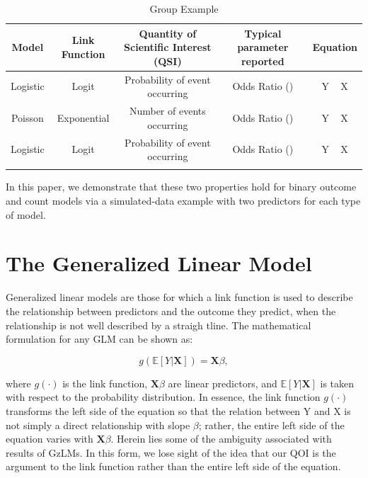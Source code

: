 \documentclass[jou, apacite]{apa6}
\begin{document}
\begin{table}[htp]
\centering
\addtolength{\tabcolsep}{3pt} %

\caption{Group Example}

\begin{tabular}{| c | c | c| c | c |}
\toprule
Model & Link Function & Quantity of Scientific Interest (QSI) & Typical parameter reported & Equation\\
\midrule
Logistic & Logit & Probability of event occurring & Odds Ratio () & Y ~ X \\
Poisson & Exponential & Number of events occurring& Odds Ratio () & Y ~ X \\
Logistic & Logit & Probability of event occurring & Odds Ratio () & Y ~ X \\
\addlinespace
\midrule[\heavyrulewidth]
\end{tabular}

\end{table}



In this paper, we demonstrate that these two properties hold for binary outcome and count models via a simulated-data example with two predictors for each type of model.
 
\section{The Generalized Linear Model}
Generalized linear models are those for which a link function is used to describe the relationship between predictors and the outcome they predict, when the relationship is not well described by a straigh tline. 
The mathematical formulation for any GLM can be shown as:

\begin{equation}
g(\mathbb{E}[Y|\bm{X}]) = \bm{X} \beta ,
\end{equation}

where $g(\cdot)$ is the link function, $\bm{X}\beta$ are linear predictors, and $\mathbb{E}[Y|\bm{X}]$ is taken with respect to the probability distribution. In essence, the link function $g(\cdot)$ transforms the left side of the equation so that the relation between Y and X is not simply a direct relationship with slope $\beta$; rather, the entire left side of the equation varies with $\bm{X}\beta$.
Herein lies some of the ambiguity associated with results of GzLMs.
In this form, we lose sight of the idea that our QOI is the argument to the link function rather than the entire left side of the equation.
\end{document}
